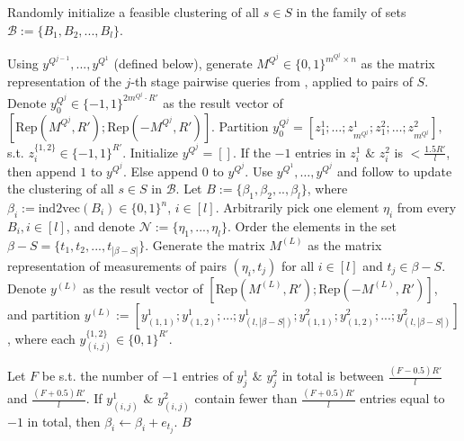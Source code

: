 \documentclass{article}
\newcommand\mc{\mathcal}
\begin{document}
\begin{algorithm}
\begin{algorithmic}[1]
    \State Randomly initialize a feasible clustering of all $s\in S$ in the family of sets $\mc{B}:=\{B_1,B_2,...,B_l\}$.  
    \begin{scriptsize}\end{scriptsize}
    \State Using $y^{Q^{j-1}},...,y^{Q^1}$ (defined below), generate $M^{Q^j}\in\{0,1\}^{m^{Q^j}\times n}$ as the matrix representation of the $j$-th stage pairwise queries from \cite[Theorem~1.1]{black2025learning}, applied to pairs of $S$. 
    \State Denote $y^{Q^j}_0\in\{-1,1\}^{2m^{Q^j}\cdot R'}$ as the result vector of \([\mathrm{Rep}(M^{Q^j},R');\mathrm{Rep}(-M^{Q^j},R')].\)
    \State Partition
    \(
    y^{Q^j}_0=[z_1^1;\ldots;z_{m^{Q^j}}^1;z_1^2;\ldots;z_{m^{Q^j}}^2],
    \)
    s.t. $z_i^{\{1,2\}}\in\{-1,1\}^{R'}$. Initialize $y^{Q^j}= []$.
        \State If the $-1$ entries in $z_i^1$ $\&$ $z_i^2$ is $<\frac{1.5R'}{l}$, then append $1$ to $y^{Q^j}$. Else append $0$ to $y^{Q^j}$.
    \EndFor
\State Use $y^{Q^1},\ldots,y^{Q^j}$ and follow \cite[Theorem~1.1]{black2025learning} to update the clustering of all $s\in S$ in $\mathcal{B}$.
    \EndFor
    \State Let $B:=\{\beta_1,\beta_2,..,\beta_l\}$, where $\beta_i:=\mathrm{ind2vec}(B_i)\in\{0,1\}^n$, $i\in[l]$.
    \State Arbitrarily pick one element $\eta_i$ from every $B_i,i\in[l]$, and denote $\mc{N}:=\{\eta_1,...,\eta_l\}$. Order the elements in the set $\beta-S=\{t_1,t_2,...,t_{|\beta-S|}\}$. Generate the matrix $M^{(L)}$ as the matrix representation of measurements of pairs $(\eta_i,t_j)$ for all $i\in[l]$ and $t_j\in\beta-S$. %
    \State Denote $y^{(L)}$ as the result vector of $[\mathrm{Rep}(M^{(L)},R');\mathrm{Rep}(-M^{(L)},R')]$, and partition $y^{(L)}:=[y_{(1,1)}^1;y_{(1,2)}^1;...;y_{(l,|\beta-S|)}^1;y_{(1,1)}^2;y_{(1,2)}^2;...;y_{(l,|\beta-S|)}^2]$, where each $y_{(i,j)}^{\{1,2\}}\in \{0,1\}^{R'}$. 
    
    \begin{scriptsize}
    \end{scriptsize}
    \State Let $F$ be s.t. the number of $-1$ entries of $y_j^1$ $\&$ $y_j^2$ in total is between $\frac{(F-0.5)R'}{l}$ and $\frac{(F+0.5)R'}{l}$. 
    \State If $y_{(i,j)}^1$ $\&$ $y_{(i,j)}^2$ contain fewer than $\frac{(F+0.5)R'}{l}$ entries equal to $-1$ in total, then $\beta_i\leftarrow\beta_i+e_{t_j}$.
    \EndFor
    \State \Return $B$ 

\end{algorithmic}
\end{algorithm}
\end{document}
